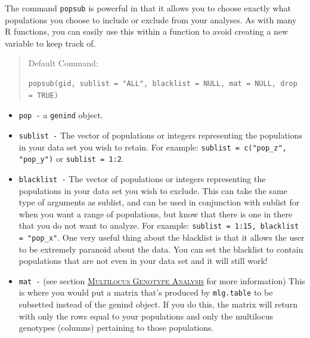 \documentclass[letterpaper]{article}\usepackage[]{graphicx}\usepackage[]{color}
\makeatletter
\newenvironment{kframe}{%
 \def\at@end@of@kframe{}%
 \ifinner\ifhmode%
  \def\at@end@of@kframe{\end{minipage}}%
  \begin{minipage}{\columnwidth}%
 \fi\fi%
 \def\FrameCommand##1{\hskip\@totalleftmargin \hskip-\fboxsep
 \colorbox{shadecolor}{##1}\hskip-\fboxsep
     \hskip-\linewidth \hskip-\@totalleftmargin \hskip\columnwidth}%
 \MakeFramed {\advance\hsize-\width
   \@totalleftmargin\z@ \linewidth\hsize
   \@setminipage}}%
 {\par\unskip\endMakeFramed%
 \at@end@of@kframe}
\newenvironment{knitrout}{}{} %
\newcommand{\tab}{\hspace*{1em}}
\newcommand{\seclink}[2]{
  \textsc{\hyperref[#1]{#2}}
}
\makeatother
\begin{document}
\tab\tab The command \texttt{popsub} is powerful in that it allows you to choose exactly what populations you choose to include or exclude from your analyses. As with many R functions, you can easily use this within a function to avoid creating a new variable to keep track of.  
\begin{quote}
Default Command:
\begin{knitrout}
\color{fgcolor}\begin{kframe}
\begin{verbatim}
popsub(gid, sublist = "ALL", blacklist = NULL, mat = NULL, drop = TRUE)
\end{verbatim}
\end{kframe}
\end{knitrout}


\end{quote}
\begin{itemize}
  \item \texttt{pop -} a \texttt{genind} object.
  \item \texttt{sublist -} The vector of populations or integers representing the populations in your data set you wish to retain. For example: \texttt{sublist = c("pop\_z", "pop\_y")} or \texttt{sublist = 1:2}.
  \item \texttt{blacklist -} The vector of populations or integers representing the populations in your data set you wish to exclude. This can take the same type of arguments as sublist, and can be used in conjunction with sublist for when you want a range of populations, but know that there is one in there that you do not want to analyze. For example: \texttt{sublist = 1:15, blacklist = "pop\_x"}.
  One very useful thing about the blacklist is that it allows the user to be extremely paranoid about the data. You can set the blacklist to contain populations that are not even in your data set and it will still work!
  \item \texttt{mat -} (see section\seclink{mlg}{Multilocus Genotype Analysis}for more information) This is where you would put a matrix that's produced by \texttt{mlg.table} to be subsetted instead of the genind object. If you do this, the matrix will return with only the rows equal to your populations and only the multilocus genotypes (columns) pertaining to those populations. 
\end{itemize}
\end{document}
